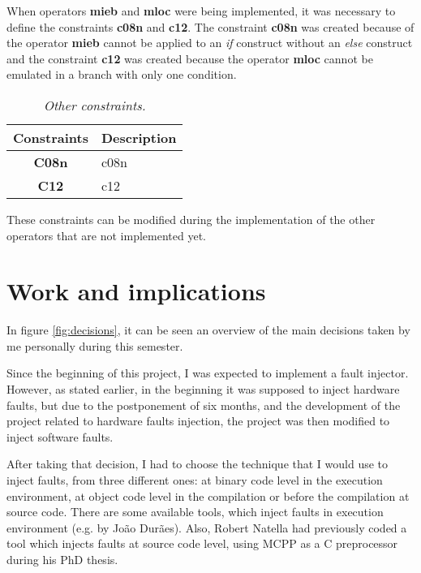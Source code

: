 When operators \textbf{\ac{mieb}} and \textbf{\ac{mloc}} were being implemented, it was necessary to define the constraints \textbf{\ac{c08n}} and \textbf{\ac{c12}}. The constraint \textbf{\ac{c08n}} was created because of the operator \textbf{\ac{mieb}} cannot be applied to an \textit{if} construct without an \textit{else} construct and the constraint \textbf{\ac{c12}} was created because the operator \textbf{\ac{mloc}} cannot be emulated in a branch with only one condition.

\begin{table}[!ht]
\centering
\begin{tabular}{|c|p{12cm}|}
\hline
\textbf{Constraints}            & \multicolumn{1}{c|}{\textbf{Description}}                                     \\ \hline \hline
\textbf{C08n}         & \Acl{c08n} \\ \hline
\textbf{C12}         & \Acl{c12} \\ \hline
\end{tabular}
\caption{\small \sl Other constraints.\label{tab:otherConstraints}}
\end{table}

These constraints can be modified during the implementation of the other operators that are not implemented yet.

\clearpage
\section{Work and implications}

In figure \ref{fig:decisions}, it can be seen an overview of the main decisions taken by me personally during this semester.

Since the beginning of this project, I was expected to implement a fault injector. However, as stated earlier, in the beginning it was supposed to inject hardware faults, but due to the postponement of six months, and the development of the project related to hardware faults injection, the project was then modified to inject software faults.

After taking that decision, I had to choose the technique that I would use to inject faults, from three different ones: at binary code level in the execution environment, at object code level in the compilation or before the compilation at source code. There are some available tools, which inject faults in execution environment (e.g. by João Durães). Also, Robert Natella had previously coded a tool which injects faults at source code level, using MCPP as a C preprocessor during his PhD thesis.

